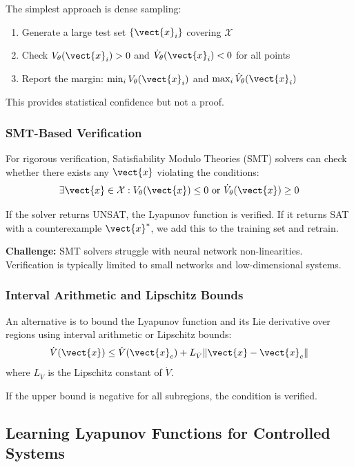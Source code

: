The simplest approach is dense sampling:
\begin{enumerate}
    \item Generate a large test set $\{\vect{x}_i\}$ covering $\mathcal{X}$
    \item Check $V_\theta(\vect{x}_i) > 0$ and $\dot{V}_\theta(\vect{x}_i) < 0$ for all points
    \item Report the margin: $\min_i V_\theta(\vect{x}_i)$ and $\max_i \dot{V}_\theta(\vect{x}_i)$
\end{enumerate}

This provides statistical confidence but not a proof.

\subsubsection{SMT-Based Verification}

For rigorous verification, Satisfiability Modulo Theories (SMT) solvers can check whether there exists any $\vect{x}$ violating the conditions:
\begin{equation}
\exists \vect{x} \in \mathcal{X}: V_\theta(\vect{x}) \leq 0 \text{ or } \dot{V}_\theta(\vect{x}) \geq 0
\label{eq:smt_query}
\end{equation}

If the solver returns UNSAT, the Lyapunov function is verified. If it returns SAT with a counterexample $\vect{x}^*$, we add this to the training set and retrain.

\textbf{Challenge:} SMT solvers struggle with neural network non-linearities. Verification is typically limited to small networks and low-dimensional systems.

\subsubsection{Interval Arithmetic and Lipschitz Bounds}

An alternative is to bound the Lyapunov function and its Lie derivative over regions using interval arithmetic or Lipschitz bounds:
\begin{equation}
\dot{V}(\vect{x}) \leq \dot{V}(\vect{x}_c) + L_{\dot{V}} \|\vect{x} - \vect{x}_c\|
\end{equation}
where $L_{\dot{V}}$ is the Lipschitz constant of $\dot{V}$.

If the upper bound is negative for all subregions, the condition is verified.

\subsection{Learning Lyapunov Functions for Controlled Systems}

